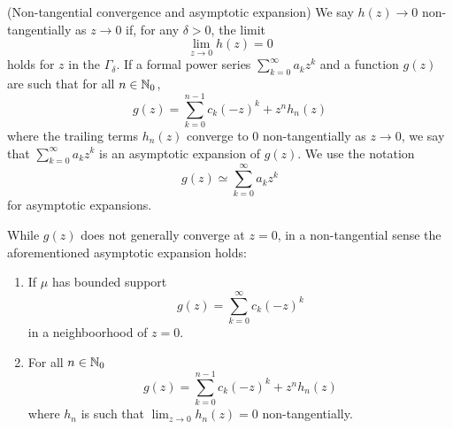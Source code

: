 \begin{definition} (Non-tangential convergence and asymptotic expansion)
  We say $h(z) \rightarrow 0$ non-tangentially as $z \rightarrow 0$ if, for any $\delta > 0$, the limit 
  \[
    \lim_{z \rightarrow 0} h(z) = 0
  \]
  holds for $z$ in the $\Gamma_\delta$. If a formal power series $\sum_{k=0}^\infty a_k z^k$ and a function $g(z)$ are such that for all $n\in \mathbb{N}_0$,
  \[
    g(z) = \sum_{k = 0}^{n-1} c_k{(-z)}^k + z^n h_n(z)
  \]
  where the trailing terms $h_n(z)$ converge to $0$ non-tangentially as $z \rightarrow 0$, we say that $\sum_{k=0}^\infty a_k z^k$ is an asymptotic expansion of $g(z)$. We use the notation
  \[
    g(z) \simeq \sum_{k=0}^\infty a_k z^k
  \]
  for asymptotic expansions.
\end{definition}

While $g(z)$ does not generally converge at $z = 0$, in a non-tangential sense the aforementioned asymptotic expansion holds:
\begin{proposition}
  \begin{enumerate}
    \item If $\mu$ has bounded support
    \[
      g(z) = \sum_{k = 0}^\infty c_k{(-z)}^k
    \]
    in a neighboorhood of $z=0$.
    \item For all $n \in \mathbb{N}_0$
    \begin{equation}
      g(z) = \sum_{k = 0}^{n-1} c_k{(-z)}^k + z^n h_n(z) \label{assexp}
    \end{equation}
    where $h_n$ is such that $\lim_{z \rightarrow 0} h_n(z) = 0$ non-tangentially.
  \end{enumerate}
\end{proposition}

